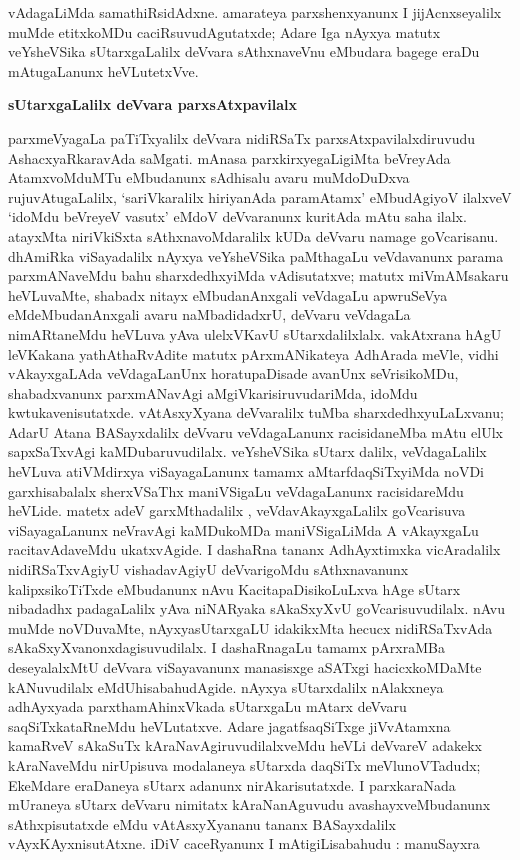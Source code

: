 vAdagaLiMda samathiRsidAdxne. amarateya parxshenxyanunx I jijAcnxseyalilx muMde etitxkoMDu caciRsuvudAgutatxde; Adare Iga nAyxya matutx veYsheVSika sUtarxgaLalilx deVvara sAthxnaveVnu eMbudara bagege eraDu mAtugaLanunx heVLutetxVve.

\smallskip
\begin{center}
{\Large\bf sUtarxgaLalilx deVvara parxsAtxpavilalx}
\end{center}

parxmeVyagaLa paTiTxyalilx deVvara nidiRSaTx parxsAtxpavilalxdiruvudu AshacxyaRkaravAda saMgati. mAnasa parxkirxyegaLigiMta beVreyAda AtamxvoMduMTu eMbudanunx sAdhisalu avaru muMdoDuDxva rujuvAtugaLalilx, `sariVkaralilx hiriyanAda paramAtamx' eMbudAgiyoV ilalxveV `idoMdu beVreyeV vasutx' eMdoV deVvaranunx kuritAda mAtu saha ilalx. atayxMta niriVkiSxta sAthxnavoMdaralilx kUDa deVvaru namage goVcarisanu. dhAmiRka viSayadalilx nAyxya veYsheVSika paMthagaLu veVdavanunx parama parxmANaveMdu bahu sharxdedhxyiMda vAdisutatxve; matutx miVmAMsakaru heVLuvaMte, shabadx nitayx eMbudanAnxgali veVdagaLu apwruSeVya eMdeMbudanAnxgali avaru naMbadidadxrU, deVvaru veVdagaLa nimARtaneMdu heVLuva yAva ulelxVKavU sUtarxdalilxlalx. vakAtxrana hAgU leVKakana yathAthaRvAdite matutx pArxmANikateya AdhArada meVle, vidhi vAkayxgaLAda veVdagaLanUnx horatupaDisade avanUnx seVrisikoMDu, shabadxvanunx parxmANavAgi aMgiVkarisiruvudariMda, idoMdu kwtukavenisutatxde. vAtAsxyXyana deVvaralilx tuMba sharxdedhxyuLaLxvanu; AdarU Atana BASayxdalilx deVvaru veVdagaLanunx racisidaneMba mAtu elUlx sapxSaTxvAgi kaMDubaruvudilalx. veYsheVSika sUtarx dalilx, veVdagaLalilx heVLuva atiVMdirxya viSayagaLanunx tamamx aMtarfdaqSiTxyiMda noVDi garxhisabalalx sherxVSaThx maniVSigaLu veVdagaLanunx racisidareMdu heVLide. matetx adeV garxMthadalilx , veVdavAkayxgaLalilx goVcarisuva viSayagaLanunx neVravAgi kaMDukoMDa maniVSigaLiMda A vAkayxgaLu racitavAdaveMdu ukatxvAgide. I dashaRna tananx AdhAyxtimxka vicAradalilx nidiRSaTxvAgiyU vishadavAgiyU deVvarigoMdu sAthxnavanunx kalipxsikoTiTxde eMbudanunx nAvu KacitapaDisikoLuLxva hAge sUtarx nibadadhx padagaLalilx yAva niNARyaka sAkaSxyXvU goVcarisuvudilalx. nAvu muMde noVDuvaMte, nAyxyasUtarxgaLU idakikxMta hecucx nidiRSaTxvAda sAkaSxyXvanonxdagisuvudilalx. I dashaRnagaLu tamamx pArxraMBa deseyalalxMtU deVvara viSayavanunx manasisxge aSATxgi hacicxkoMDaMte kANuvudilalx eMdUhisabahudAgide. nAyxya sUtarxdalilx nAlakxneya adhAyxyada parxthamAhinxVkada  sUtarxgaLu mAtarx deVvaru saqSiTxkataRneMdu heVLutatxve. Adare jagatfsaqSiTxge jiVvAtamxna kamaRveV sAkaSuTx kAraNavAgiruvudilalxveMdu heVLi deVvareV adakekx kAraNaveMdu nirUpisuva modalaneya sUtarxda daqSiTx meVlunoVTadudx; EkeMdare eraDaneya sUtarx adanunx nirAkarisutatxde. I parxkaraNada mUraneya sUtarx deVvaru nimitatx kAraNanAguvudu avashayxveMbudanunx sAthxpisutatxde eMdu vAtAsxyXyananu tananx BASayxdalilx vAyxKAyxnisutAtxne. iDiV caceRyanunx I mAtigiLisabahudu : manuSayxra 